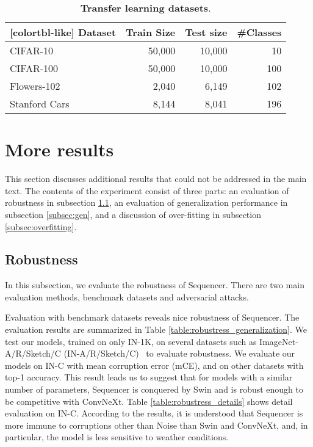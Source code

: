 \documentclass{article}
\begin{document}
\begin{table}[t]
  \centering
  \caption{\textbf{Transfer learning datasets}.} 
  \small
\begin{NiceTabular}{l|rrr}[colortbl-like]
Dataset & Train Size & Test size & \#Classes \\\hline
   CIFAR-10~\cite{krizhevsky2009learning} & 50,000 & 10,000 & 10 \\
   CIFAR-100~\cite{krizhevsky2009learning} & 50,000 & 10,000 & 100 \\
   Flowers-102~\cite{nilsback2008automated} & 2,040 & 6,149 & 102 \\ 
   Stanford Cars~\cite{krause20133d} & 8,144 & 8,041 & 196 \\ \bottomrule
\end{NiceTabular}
\label{table:transfer_dataset}
\end{table}


\section{More results}
\label{sec:more_results}
This section discusses additional results that could not be addressed in the main text. The contents of the experiment consist of three parts: an evaluation of robustness in subsection \ref{subsec:rob}, an evaluation of generalization performance in subsection \ref{subsec:gen}, and a discussion of over-fitting in subsection \ref{subsec:overfitting}.

\subsection{Robustness}
\label{subsec:rob}
In this subsection, we evaluate the robustness of Sequencer. There are two main evaluation methods, benchmark datasets and adversarial attacks.

 Evaluation with benchmark datasets reveals nice robustness of Sequencer. The evaluation results are summarized in Table \ref{table:robustress_generalization}. We test our models, trained on only IN-1K, on several datasets such as ImageNet-A/R/Sketch/C (IN-A/R/Sketch/C)~\cite{hendrycks2021natural, hendrycks2021many, wang2019learning, hendrycks2018benchmarking} to evaluate robustness. We evaluate our models on IN-C with mean corruption error (mCE), and on other datasets with top-1 accuracy. This result leads us to suggest that for models with a similar number of parameters, Sequencer is conquered by Swin and is robust enough to be competitive with ConvNeXt. Table \ref{table:robustress_details} shows detail evaluation on IN-C. According to the results, it is understood that Sequencer is more immune to corruptions other than Noise than Swin and ConvNeXt, and, in particular, the model is less sensitive to weather conditions.
 
\end{document}
